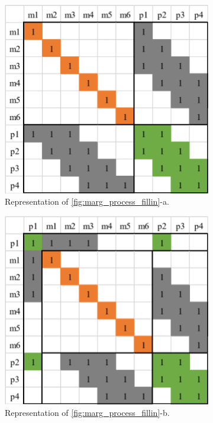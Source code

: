 \documentclass[12pt]{report}   %
\begin{document}
\begin{figure}[H]
	\centering
	\begin{subfigure}[t]{.4\linewidth}
	\centering\includegraphics[width=.8\linewidth]{figures/marg_01.png}
	\caption{Representation of \ref{fig:marg_process_fillin}-a.}
	\end{subfigure}
	\begin{subfigure}[t]{.4\linewidth}
		\centering\includegraphics[width=.8\linewidth]{figures/marg_02.png}
		\caption{Representation of \ref{fig:marg_process_fillin}-b.}
	\end{subfigure}
	\begin{subfigure}[t]{.4\linewidth}

\end{subfigure}
\end{figure}
\end{document}
